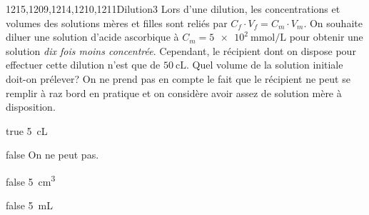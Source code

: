 \documentclass[11pt]{article}
\begin{document}
			\begin{question}{1215,1209,1214,1210,1211}{Dilution}{3}{}
				Lors d'une dilution, les concentrations et volumes des solutions mères et filles sont reliés par $C_f\cdot V_f = C_m\cdot V_m$. On souhaite diluer une solution d'acide ascorbique à $C_m = \SI{5e2}{\milli\mole\per\liter}$ pour obtenir une solution \emph{dix fois moins concentrée}. Cependant, le récipient dont on dispose pour effectuer cette dilution n'est que de $\SI{50}{\centi\liter}$. Quel volume de la solution initiale doit-on prélever? On ne prend pas en compte le fait que le récipient ne peut se remplir à raz bord en pratique et on considère avoir assez de solution mère à disposition.
			\end{question}
			\begin{reponses} 
				\item[true] \SI{5}{\centi\liter}
				\item[false] On ne peut pas.
				\item[false] \SI{5}{\centi\meter\cubed}
				\item[false] \SI{5}{\milli\liter}
			\end{reponses}
			
\end{document}
